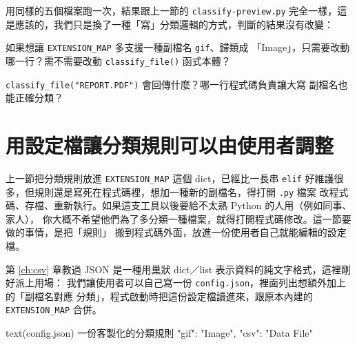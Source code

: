 用同樣的五個檔案跑一次，結果跟上一節的 \texttt{classify-preview.py} 完全一樣，這
是應該的，我們只是換了一種「寫」分類邏輯的方式，判斷的結果沒有改變：



\begin{drills}[label=drills:classify-function]
\item 如果想讓 \texttt{EXTENSION\_MAP} 多支援一種副檔名 \texttt{gif}、歸類成
「Image」，只需要改動哪一行？需不需要改動 \texttt{classify\_file()} 函式本體？
\item \texttt{classify\_file("REPORT.PDF")} 會回傳什麼？哪一行程式碼負責讓大寫
副檔名也能正確分類？
\end{drills}

\section{用設定檔讓分類規則可以由使用者調整}
\label{sec:config-file}

上一節把分類規則放進 \texttt{EXTENSION\_MAP} 這個 dict，已經比一長串 \texttt{elif}
好維護很多，但規則還是寫死在程式碼裡，想加一種新的副檔名，得打開 \texttt{.py} 檔案
改程式碼、存檔、重新執行。如果這支工具以後要給不太熟 Python 的人用（例如同事、家人），
你大概不希望他們為了多分類一種檔案，就得打開程式碼修改。這一節要做的事情，是把「規則」
搬到程式碼外面，放進一份使用者自己就能編輯的設定檔。

第 \ref{ch:csv} 章教過 JSON 是一種用巢狀 dict／list 表示資料的純文字格式，這裡剛好派上用場：
我們讓使用者可以自己寫一份 \texttt{config.json}，裡面列出想額外加上的「副檔名對應
分類」，程式啟動時把這份設定檔讀進來，跟原本內建的 \texttt{EXTENSION\_MAP} 合併。

\begin{code}{text}{(config.json) 一份客製化的分類規則}
{
    "gif": "Image",
    "csv": "Data File"
}
\end{code}

